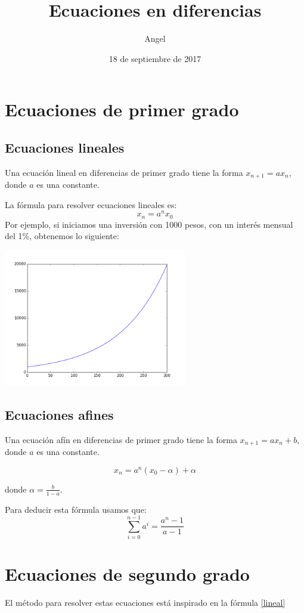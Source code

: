 \documentclass{article}
\title{Ecuaciones en diferencias}
\author{Angel}
\date{18 de septiembre de 2017}
\begin{document}
\maketitle

\section{Ecuaciones de primer grado}

\subsection{Ecuaciones lineales}

Una ecuación lineal en diferencias de primer grado tiene la forma $x_{n+1}=ax_n$, donde $a$ es una constante.

La fórmula para resolver ecuaciones lineales es:
\begin{equation}
 \label{lineal}
x_n=a^nx_0
\end{equation}
Por ejemplo, si iniciamos una inversión con 1000 pesos, con un interés mensual del 1\%, obtenemos lo siguiente:
\begin{center}
  \includegraphics[width=8cm]{inversion.png}
\end{center}



\subsection{Ecuaciones afines}

Una ecuación afín en diferencias de primer grado tiene la forma $x_{n+1}=ax_n+b$, donde $a$ es una constante.

\begin{equation}
  \label{afin}
  x_n=a^n(x_0-\alpha)+\alpha
\end{equation}

donde $\alpha=\frac{b}{1-a}$.

Para deducir esta fórmula usamos que: $$\sum_{i=0}^{n-1}a^i=\frac{a^n-1}{a-1}$$

\section{Ecuaciones de segundo grado}

El método para resolver estas ecuaciones está inspirado en la fórmula \ref{lineal}
\end{document}
